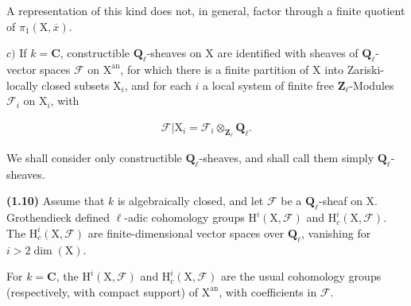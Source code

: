 \documentclass[10pt,leqno]{article}
\begin{document}
\noindent A representation of this kind does not, in general, factor through a finite quotient of \(\pi _{1}(\mathrm{X},\overline{x})\).\par

\noindent \(c)\) If \(k=\mathbf{C}\), constructible \(\mathbf{Q}_{\ell }\)-sheaves on \(\mathrm{X}\) are identified with sheaves of \(\mathbf{Q}_{\ell }\)-vector spaces \(\mathcal{F} \) on \(\mathrm{X}^{\mathrm{an}}\), for which there is a finite partition of \(\mathrm{X}\) into Zariski-locally closed subsets \(\mathrm{X}_{i}\), and for each \(i\) a local system of finite free \(\mathbf{Z}_{\ell }\)-Modules \(\mathcal{F} _{i}\) on \(\mathrm{X}_{i}\), with\par

\begin{equation*}\begin{gathered}\mathcal{F} |\mathrm{X}_{i} = \mathcal{F} _{i} \otimes _{\mathbf{Z}_{\ell }} \mathbf{Q}_{\ell }.\end{gathered}\end{equation*}

\noindent We shall consider only constructible \(\mathbf{Q}_{\ell }\)-sheaves, and shall call them simply \(\mathbf{Q}_{\ell }\)-sheaves.\par

\noindent \textbf{(1.10)} Assume that \(k\) is algebraically closed, and let \(\mathcal{F} \) be a \(\mathbf{Q}_{\ell }\)-sheaf on \(\mathrm{X}\). Grothendieck defined \(\ell \)-adic cohomology groups \(\mathrm{H}^{i}(\mathrm{X},\mathcal{F} )\) and \(\mathrm{H}_{c}^{i}(\mathrm{X},\mathcal{F} )\). The \(\mathrm{H}_{c}^{i}(\mathrm{X},\mathcal{F} )\) are finite-dimensional vector spaces over \(\mathbf{Q}_{\ell }\), vanishing for \(i>2 \operatorname{dim}(\mathrm{X})\).\par

\clearpage

\label{physical-7}

\noindent For \(k=\mathbf{C}\), the \(\mathrm{H}^{i}(\mathrm{X},\mathcal{F} )\) and \(\mathrm{H}_{c}^{i}(\mathrm{X},\mathcal{F} )\) are the usual cohomology groups (respectively, with compact support) of \(\mathrm{X}^{\mathrm{an}}\), with coefficients in \(\mathcal{F} \).\par
\end{document}
